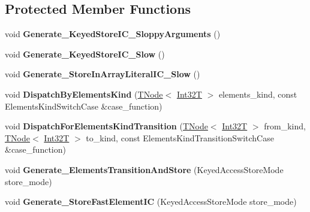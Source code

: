 \subsection*{Protected Member Functions}
\begin{DoxyCompactItemize}
\item 
\mbox{\label{classv8_1_1internal_1_1HandlerBuiltinsAssembler_aadce05904e0d7ed4d043ab72948309a4}} 
void {\bfseries Generate\+\_\+\+Keyed\+Store\+I\+C\+\_\+\+Sloppy\+Arguments} ()
\item 
\mbox{\label{classv8_1_1internal_1_1HandlerBuiltinsAssembler_adc7ed797dc9a3f18d5e74d8c4de4562a}} 
void {\bfseries Generate\+\_\+\+Keyed\+Store\+I\+C\+\_\+\+Slow} ()
\item 
\mbox{\label{classv8_1_1internal_1_1HandlerBuiltinsAssembler_adcb2f83805d238d11b6d1124ffe4f841}} 
void {\bfseries Generate\+\_\+\+Store\+In\+Array\+Literal\+I\+C\+\_\+\+Slow} ()
\item 
\mbox{\label{classv8_1_1internal_1_1HandlerBuiltinsAssembler_a611c5d6413da7d86eff0cdb375059ccc}} 
void {\bfseries Dispatch\+By\+Elements\+Kind} (\mbox{\hyperlink{classv8_1_1internal_1_1compiler_1_1TNode}{T\+Node}}$<$ \mbox{\hyperlink{structv8_1_1internal_1_1Int32T}{Int32T}} $>$ elements\+\_\+kind, const Elements\+Kind\+Switch\+Case \&case\+\_\+function)
\item 
\mbox{\label{classv8_1_1internal_1_1HandlerBuiltinsAssembler_af161155f57beab705631b14c48779452}} 
void {\bfseries Dispatch\+For\+Elements\+Kind\+Transition} (\mbox{\hyperlink{classv8_1_1internal_1_1compiler_1_1TNode}{T\+Node}}$<$ \mbox{\hyperlink{structv8_1_1internal_1_1Int32T}{Int32T}} $>$ from\+\_\+kind, \mbox{\hyperlink{classv8_1_1internal_1_1compiler_1_1TNode}{T\+Node}}$<$ \mbox{\hyperlink{structv8_1_1internal_1_1Int32T}{Int32T}} $>$ to\+\_\+kind, const Elements\+Kind\+Transition\+Switch\+Case \&case\+\_\+function)
\item 
\mbox{\label{classv8_1_1internal_1_1HandlerBuiltinsAssembler_a8a97c6c2f5b2071187f23d278d7a2ff3}} 
void {\bfseries Generate\+\_\+\+Elements\+Transition\+And\+Store} (Keyed\+Access\+Store\+Mode store\+\_\+mode)
\item 
\mbox{\label{classv8_1_1internal_1_1HandlerBuiltinsAssembler_a5863ae86a5c501d89297385976e03a92}} 
void {\bfseries Generate\+\_\+\+Store\+Fast\+Element\+IC} (Keyed\+Access\+Store\+Mode store\+\_\+mode)
\end{DoxyCompactItemize}
